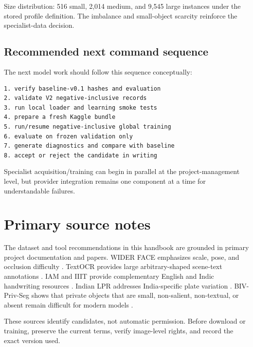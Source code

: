 Size distribution: 516 small, 2,014 medium, and 9,545 large instances under the stored profile definition. The imbalance and small-object scarcity reinforce the specialist-data decision.

\section{Recommended next command sequence}

The next model work should follow this sequence conceptually:

\begin{lstlisting}[language={}]
1. verify baseline-v0.1 hashes and evaluation
2. validate V2 negative-inclusive records
3. run local loader and learning smoke tests
4. prepare a fresh Kaggle bundle
5. run/resume negative-inclusive global training
6. evaluate on frozen validation only
7. generate diagnostics and compare with baseline
8. accept or reject the candidate in writing
\end{lstlisting}

Specialist acquisition/training can begin in parallel at the project-management level, but provider integration remains one component at a time for understandable failures.

\chapter{Primary source notes}

The dataset and tool recommendations in this handbook are grounded in primary project documentation and papers. WIDER FACE emphasizes scale, pose, and occlusion difficulty \citep{yang2016wider}. TextOCR provides large arbitrary-shaped scene-text annotations \citep{singh2021textocr}. IAM and IIIT provide complementary English and Indic handwriting resources \citep{dutta2018iam,gongidi2021indic}. Indian LPR addresses India-specific plate variation \citep{agarwal2021indianlpr}. BIV-Priv-Seg shows that private objects that are small, non-salient, non-textual, or absent remain difficult for modern models \citep{tseng2025biv}.

These sources identify candidates, not automatic permission. Before download or training, preserve the current terms, verify image-level rights, and record the exact version used.
